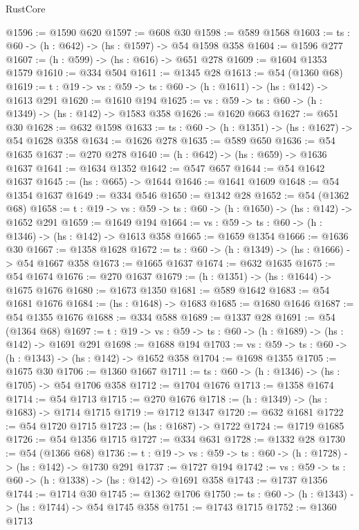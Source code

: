 \begin{lexlean}{RustCore}
\begin{coremodule}
@1596 := @1590 @620
@1597 := @608 @30
@1598 := @589 @1568
@1603 := {ts : @60} -> (h : @642) -> (hs : @1597) -> @54 @1598 @358
@1604 := @1596 @277
@1607 := (h : @599) -> (hs : @616) -> @651 @278
@1609 := @1604 @1353 @1579
@1610 := @334 @504
@1611 := @1345 @28
@1613 := @54 (@1360 @68)
@1619 := {t : @19} -> {vs : @59} -> {ts : @60} -> (h : @1611) -> (hs : @142) -> @1613 @291
@1620 := @1610 @194
@1625 := {vs : @59} -> {ts : @60} -> (h : @1349) -> (hs : @142) -> @1583 @358
@1626 := @1620 @663
@1627 := @651 @30
@1628 := @632 @1598
@1633 := {ts : @60} -> (h : @1351) -> (hs : @1627) -> @54 @1628 @358
@1634 := @1626 @278
@1635 := @589 @650
@1636 := @54 @1635
@1637 := @270 @278
@1640 := (h : @642) -> (hs : @659) -> @1636 @1637
@1641 := @1634 @1352
@1642 := @547 @657
@1644 := @54 @1642 @1637
@1645 := (hs : @665) -> @1644
@1646 := @1641 @1609
@1648 := @54 @1354 @1637
@1649 := @334 @546
@1650 := @1342 @28
@1652 := @54 (@1362 @68)
@1658 := {t : @19} -> {vs : @59} -> {ts : @60} -> (h : @1650) -> (hs : @142) -> @1652 @291
@1659 := @1649 @194
@1664 := {vs : @59} -> {ts : @60} -> (h : @1346) -> (hs : @142) -> @1613 @358
@1665 := @1659 @1354
@1666 := @1636 @30
@1667 := @1358 @1628
@1672 := {ts : @60} -> (h : @1349) -> (hs : @1666) -> @54 @1667 @358
@1673 := @1665 @1637
@1674 := @632 @1635
@1675 := @54 @1674
@1676 := @270 @1637
@1679 := (h : @1351) -> (hs : @1644) -> @1675 @1676
@1680 := @1673 @1350
@1681 := @589 @1642
@1683 := @54 @1681 @1676
@1684 := (hs : @1648) -> @1683
@1685 := @1680 @1646
@1687 := @54 @1355 @1676
@1688 := @334 @588
@1689 := @1337 @28
@1691 := @54 (@1364 @68)
@1697 := {t : @19} -> {vs : @59} -> {ts : @60} -> (h : @1689) -> (hs : @142) -> @1691 @291
@1698 := @1688 @194
@1703 := {vs : @59} -> {ts : @60} -> (h : @1343) -> (hs : @142) -> @1652 @358
@1704 := @1698 @1355
@1705 := @1675 @30
@1706 := @1360 @1667
@1711 := {ts : @60} -> (h : @1346) -> (hs : @1705) -> @54 @1706 @358
@1712 := @1704 @1676
@1713 := @1358 @1674
@1714 := @54 @1713
@1715 := @270 @1676
@1718 := (h : @1349) -> (hs : @1683) -> @1714 @1715
@1719 := @1712 @1347
@1720 := @632 @1681
@1722 := @54 @1720 @1715
@1723 := (hs : @1687) -> @1722
@1724 := @1719 @1685
@1726 := @54 @1356 @1715
@1727 := @334 @631
@1728 := @1332 @28
@1730 := @54 (@1366 @68)
@1736 := {t : @19} -> {vs : @59} -> {ts : @60} -> (h : @1728) -> (hs : @142) -> @1730 @291
@1737 := @1727 @194
@1742 := {vs : @59} -> {ts : @60} -> (h : @1338) -> (hs : @142) -> @1691 @358
@1743 := @1737 @1356
@1744 := @1714 @30
@1745 := @1362 @1706
@1750 := {ts : @60} -> (h : @1343) -> (hs : @1744) -> @54 @1745 @358
@1751 := @1743 @1715
@1752 := @1360 @1713

\end{coremodule}
\end{lexlean}
